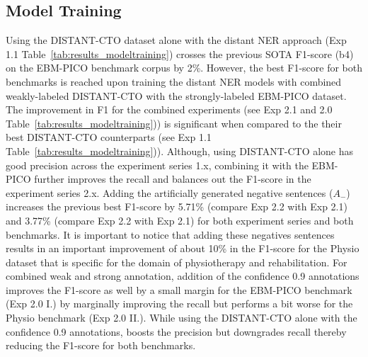 \documentclass[letterpaper]{article} %
\begin{document}
\subsection{Model Training}
\label{subsec:res_mod}
%
Using the DISTANT-CTO dataset alone with the distant NER approach (Exp 1.1 Table~\ref{tab:results_modeltraining}) crosses the previous SOTA F1-score (b4) on the EBM-PICO benchmark corpus by 2\%.
However, the best F1-score for both benchmarks is reached upon training the distant NER models with combined weakly-labeled DISTANT-CTO with the strongly-labeled EBM-PICO dataset.
The improvement in F1 for the combined experiments (see Exp 2.1 and 2.0 Table~\ref{tab:results_modeltraining})) is significant when compared to the their best DISTANT-CTO counterparts (see Exp 1.1 Table~\ref{tab:results_modeltraining})).
Although, using DISTANT-CTO alone has good precision across the experiment series 1.x, combining it with the EBM-PICO further improves the recall and balances out the F1-score in the experiment series 2.x.
Adding the artificially generated negative sentences ($A_{-}$) increases the previous best F1-score by 5.71\% (compare Exp 2.2 with Exp 2.1) and 3.77\% (compare Exp 2.2 with Exp 2.1) for both experiment series and both benchmarks.
It is important to notice that adding these negatives sentences results in an important improvement of about 10\% in the F1-score for the Physio dataset that is specific for the domain of physiotherapy and rehabilitation.
For combined weak and strong annotation, addition of the confidence 0.9 annotations improves the F1-score as well by a small margin for the EBM-PICO benchmark (Exp 2.0 I.) by marginally improving the recall but performs a bit worse for the Physio benchmark (Exp 2.0 II.).
While using the DISTANT-CTO alone with the confidence 0.9 annotations, boosts the precision but downgrades recall thereby reducing the F1-score for both benchmarks.
%
%
%
\end{document}
